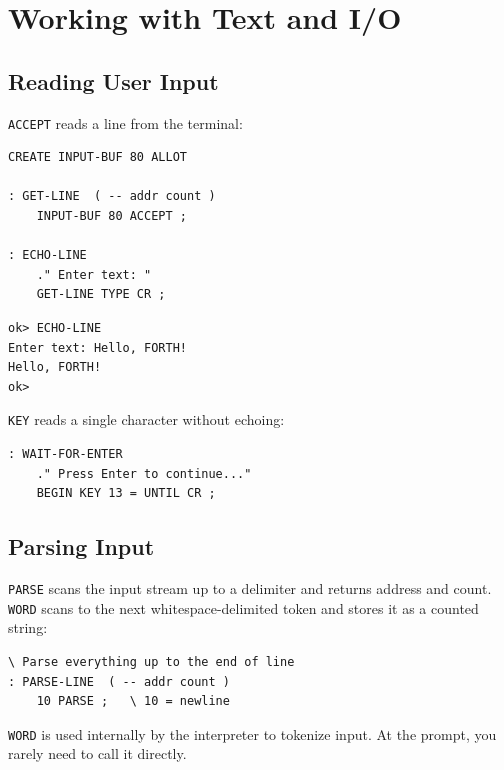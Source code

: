 \chapter{Working with Text and I/O}
\label{chap:text-io}

\section{Reading User Input}
\label{sec:user-input}

\texttt{ACCEPT} reads a line from the terminal:

\begin{lstlisting}[language=Forth]
CREATE INPUT-BUF 80 ALLOT

: GET-LINE  ( -- addr count )
    INPUT-BUF 80 ACCEPT ;

: ECHO-LINE
    ." Enter text: "
    GET-LINE TYPE CR ;
\end{lstlisting}

\begin{lstlisting}[language=Forth]
ok> ECHO-LINE
Enter text: Hello, FORTH!
Hello, FORTH!
ok>
\end{lstlisting}

\texttt{KEY} reads a single character without echoing:

\begin{lstlisting}[language=Forth]
: WAIT-FOR-ENTER
    ." Press Enter to continue..."
    BEGIN KEY 13 = UNTIL CR ;
\end{lstlisting}

\section{Parsing Input}
\label{sec:parsing}

\texttt{PARSE} scans the input stream up to a delimiter and returns address
and count. \texttt{WORD} scans to the next whitespace-delimited token and
stores it as a counted string:

\begin{lstlisting}[language=Forth]
\ Parse everything up to the end of line
: PARSE-LINE  ( -- addr count )
    10 PARSE ;   \ 10 = newline
\end{lstlisting}

\texttt{WORD} is used internally by the interpreter to tokenize input. At
the prompt, you rarely need to call it directly.

